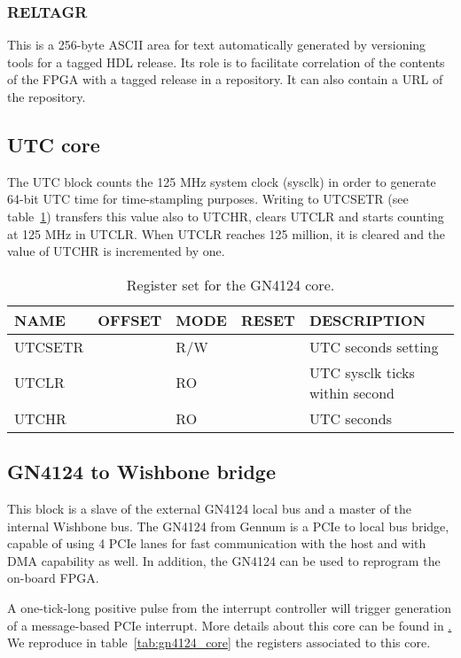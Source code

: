 \documentclass{article}
\begin{document}
\subsubsection{RELTAGR}
This is a 256-byte ASCII area for text automatically generated by versioning tools for a tagged HDL release. Its role is to facilitate correlation of the contents of the FPGA with a tagged release in a repository. It can also contain a URL of the repository.

\subsection{UTC core}
The UTC block counts the 125 MHz system clock (sysclk) in order to generate 64-bit UTC time for time-stampling purposes. Writing to UTCSETR (see table~\ref{tab:utc_core}) transfers this value also to UTCHR, clears UTCLR and starts counting at 125 MHz in UTCLR. When UTCLR reaches 125 million, it is cleared and the value of UTCHR is incremented by one.

\begin{table}[htbp]
  \centering
  \begin{tabularx}{\textwidth}{|l|r|l|l|X|}
    \hline
    \textbf{NAME} & \textbf{OFFSET} & \textbf{MODE} & \textbf{RESET} & \textbf{DESCRIPTION} \\
    \hline
    \hline
    UTCSETR & & R/W & & UTC seconds setting\\
    \hline
    UTCLR & & RO & & UTC sysclk ticks within second\\
    \hline
    UTCHR & & RO & & UTC seconds\\
    \hline
  \end{tabularx}
  \caption{Register set for the GN4124 core.}
  \label{tab:utc_core}
\end{table}

\subsection{GN4124 to Wishbone bridge}
\label{ssec:GN4124_WB}
This block is a slave of the external GN4124 local bus and a master of the internal Wishbone bus. The GN4124 from Gennum is a PCIe to local bus bridge, capable of using 4 PCIe lanes for fast communication with the host and with DMA capability as well. In addition, the GN4124 can be used to reprogram the on-board FPGA. 

A one-tick-long positive pulse from the interrupt controller will trigger generation of a message-based PCIe interrupt. More details about this core can be found in \href{http://www.ohwr.org/projects/gn4124-core/wiki}. We reproduce in table~\ref{tab:gn4124_core} the registers associated to this core. 
\end{document}
